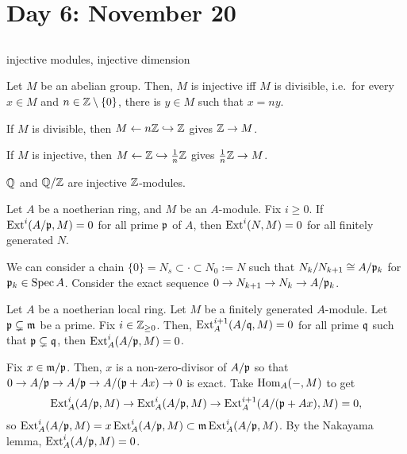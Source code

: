 \documentclass{../../../small}
\begin{document}
\section{Day 6: November 20}


\subsection*{}
injective modules, injective dimension

\begin{prop*}[6.4]
Let $M$ be an abelian group.
Then, $M$ is injective iff $M$ is divisible, i.e.~for every $x\in M$ and $n\in\mathbb{Z}\setminus\{0\}$, there is $y\in M$ such that $x=ny$.
\end{prop*}
\begin{pf}
If $M$ is divisible, then $M\leftarrow n\mathbb{Z}\hookrightarrow\mathbb{Z}$ gives $\mathbb{Z}\to M$.

If $M$ is injective, then $M\leftarrow \mathbb{Z}\hookrightarrow\frac1n\mathbb{Z}$ gives $\frac1n\mathbb{Z}\to M$.
\end{pf}
\begin{ex*}[6.5]
$\mathbb{Q}$ and $\mathbb{Q}/\mathbb{Z}$ are injective $\mathbb{Z}$-modules.
\end{ex*}

\begin{lem*}[6.6]
Let $A$ be a noetherian ring, and $M$ be an $A$-module.
Fix $i\ge0$.
If $\operatorname{Ext}^i(A/\mathfrak{p},M)=0$ for all prime $\mathfrak{p}$ of $A$, then $\operatorname{Ext}^i(N,M)=0$ for all finitely generated $N$.
\end{lem*}
\begin{pf}
We can consider a chain $\{0\}=N_s\subset\cdot\subset N_0:=N$ such that $N_k/N_{k+1}\cong A/\mathfrak{p}_k$ for $\mathfrak{p}_k\in\operatorname{Spec} A$.
Consider the exact sequence $0\to N_{k+1}\to N_k\to A/\mathfrak{p}_k$.
\end{pf}

\begin{prop*}
Let $A$ be a noetherian local ring.
Let $M$ be a finitely generated $A$-module.
Let $\mathfrak{p}\subsetneq\mathfrak{m}$ be a prime.
Fix $i\in\mathbb{Z}_{\ge0}$.
Then, $\operatorname{Ext}_A^{i+1}(A/\mathfrak{q},M)=0$ for all prime $\mathfrak{q}$ such that $\mathfrak{p}\subsetneq\mathfrak{q}$, then $\operatorname{Ext}_A^i(A/\mathfrak{p},M)=0$.
\end{prop*}
\begin{pf}
Fix $x\in\mathfrak{m}/\mathfrak{p}$.
Then, $x$ is a non-zero-divisor of $A/\mathfrak{p}$ so that $0\to A/\mathfrak{p}\to A/\mathfrak{p}\to A/(\mathfrak{p}+Ax)\to0$ is exact.
Take $\operatorname{Hom}_A(-,M)$ to get
\[\operatorname{Ext}_A^i(A/\mathfrak{p},M)\to\operatorname{Ext}_A^i(A/\mathfrak{p},M)\to\operatorname{Ext}_A^{i+1}(A/(\mathfrak{p}+Ax),M)=0,\]
so $\operatorname{Ext}_A^i(A/\mathfrak{p},M)=x\operatorname{Ext}_A^i(A/\mathfrak{p},M)\subset\mathfrak{m}\operatorname{Ext}_A^i(A/\mathfrak{p},M)$.
By the Nakayama lemma, $\operatorname{Ext}_A^i(A/\mathfrak{p},M)=0$.
\end{pf}
\end{document}
